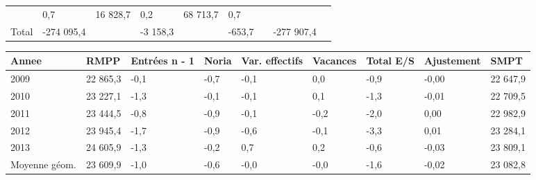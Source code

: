 \begin{longtable}[]{@{}lllllllll@{}}
\begin{minipage}[t]{0.16\columnwidth}
\end{minipage} & \begin{minipage}[t]{0.06\columnwidth}\raggedright
0,7\strut
\end{minipage} & \begin{minipage}[t]{0.12\columnwidth}\raggedright
16 828,7\strut
\end{minipage} & \begin{minipage}[t]{0.06\columnwidth}\raggedright
0,2\strut
\end{minipage} & \begin{minipage}[t]{0.09\columnwidth}\raggedright
68 713,7\strut
\end{minipage} & \begin{minipage}[t]{0.06\columnwidth}\raggedright
0,7\strut
\end{minipage}\tabularnewline
\begin{minipage}[t]{0.05\columnwidth}\raggedright
Total\strut
\end{minipage} & \begin{minipage}[t]{0.10\columnwidth}\raggedright
-274 095,4\strut
\end{minipage} & \begin{minipage}[t]{0.06\columnwidth}\raggedright
\strut
\end{minipage} & \begin{minipage}[t]{0.16\columnwidth}\raggedright
-3 158,3\strut
\end{minipage} & \begin{minipage}[t]{0.06\columnwidth}\raggedright
\strut
\end{minipage} & \begin{minipage}[t]{0.12\columnwidth}\raggedright
-653,7\strut
\end{minipage} & \begin{minipage}[t]{0.06\columnwidth}\raggedright
\strut
\end{minipage} & \begin{minipage}[t]{0.09\columnwidth}\raggedright
-277 907,4\strut
\end{minipage} & \begin{minipage}[t]{0.06\columnwidth}\raggedright
\strut
\end{minipage}\tabularnewline
\bottomrule
\end{longtable}

\begin{longtable}[]{@{}lllllllll@{}}
\toprule
Annee & RMPP & Entrées n - 1 & Noria & Var. effectifs & Vacances & Total
E/S & Ajustement & SMPT\tabularnewline
\midrule
\endhead
2009 & 22 865,3 & -0,1 & -0,7 & -0,1 & 0,0 & -0,9 & -0,00 & 22
647,9\tabularnewline
2010 & 23 227,1 & -1,3 & -0,1 & -0,1 & 0,1 & -1,3 & -0,01 & 22
709,5\tabularnewline
2011 & 23 444,5 & -0,8 & -0,9 & -0,1 & -0,2 & -2,0 & 0,00 & 22
982,9\tabularnewline
2012 & 23 945,4 & -1,7 & -0,9 & -0,6 & -0,1 & -3,3 & 0,01 & 23
284,1\tabularnewline
2013 & 24 605,9 & -1,3 & -0,2 & 0,7 & 0,2 & -0,6 & -0,03 & 23
809,1\tabularnewline
Moyenne géom. & 23 609,9 & -1,0 & -0,6 & -0,0 & -0,0 & -1,6 & -0,02 & 23
082,8\tabularnewline
\bottomrule
\end{longtable}

